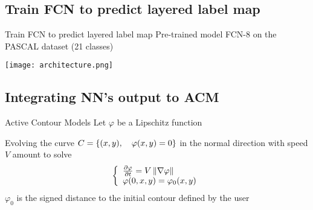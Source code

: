 \subsection{Train FCN to predict layered label map}
\begin{frame}{Train FCN to predict layered label map}
    Pre-trained model FCN-8 on the PASCAL dataset (21 classes)
     
    {\centering\texttt{[image: architecture.png]}}
\end{frame}

\subsection{Integrating NN's output to ACM}
\begin{frame}{Active Contour Models}
Let $\varphi$ be a Lipschitz function

Evolving the curve $C = \lbrace (x, y),\quad \varphi(x, y) = 0 \rbrace $ in the normal direction with speed $V$ amount to solve 
$$
\left\lbrace \begin{array}{l}
    \frac{\partial \varphi}{\partial t} = V\left\lVert\nabla \varphi\right\rVert \\
    \varphi(0, x, y) = \varphi_0(x, y) 
\end{array}
\right.
$$ 
$\varphi_0$ is the signed distance to the initial contour defined by the user

\end{frame}